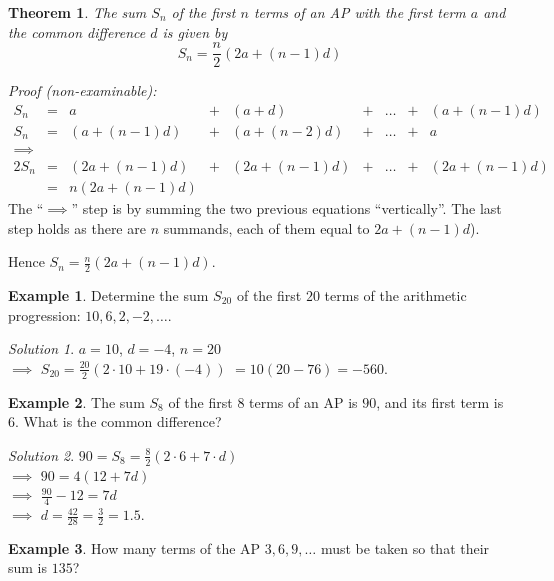 \documentclass[
  english,
  12pt,
  oneside]{book}
\newtheorem{theorem}{Theorem}[chapter]
\theoremstyle{definition}
\theoremstyle{definition}
\newtheorem{example}{Example}[chapter]
\theoremstyle{definition}
\theoremstyle{definition}
\theoremstyle{remark}
\newtheorem*{solution}{Solution}
\begin{document}
\begin{theorem}
The sum \(S_n\) of the first \(n\) terms of an AP with the first term \(a\) and the common difference \(d\) is given by
\[\boxed{S_n=\frac{n}2\left(2a+(n-1)d\right)}\]
\end{theorem}

\emph{Proof (non-examinable):}
\[\begin{array}{ccccccccc}
S_n &=& a & + & (a+d) & + & \dots & + & (a+(n-1)d) \\
S_n &=& (a+(n-1)d) & + & (a+(n-2)d) & + &  \dots & + & a\\
\implies \\
2S_n & = & (2a+(n-1)d) & + & (2a+(n-1)d) & + & \dots & + & (2a+(n-1)d)\\
& = & n(2a+(n-1)d)
\end{array}\]
The ``\(\implies\)'' step is by summing the two previous equations ``vertically''. The last step holds as there are \(n\) summands, each of them equal to \(2a+(n-1)d\)).

Hence \(S_n = \frac{n}{2}(2a+(n-1)d)\).

\begin{example}
Determine the sum \(S_{20}\) of the first \(20\) terms of the arithmetic progression: \(10, 6, 2, -2, \dots\).
\end{example}

\begin{solution}
\(a=10\), \(d=-4\), \(n=20\)\\
\(\implies\) \(S_{20}=\frac{20}{2}(2\cdot 10+ 19\cdot(-4))\) \(=10(20-76)=-560\).
\end{solution}

\begin{example}
The sum \(S_8\) of the first \(8\) terms of an AP is \(90\), and its first term is \(6\). What is the common difference?
\end{example}

\begin{solution}
\(90=S_8=\frac{8}{2}(2\cdot 6 + 7\cdot d)\)\\
\(\implies\) \(90=4(12+7d)\)\\
\(\implies\) \(\frac{90}{4}-12=7d\)\\
\(\implies\) \(d=\frac{42}{28}=\frac32=1.5\).
\end{solution}

\begin{example}
How many terms of the AP \(3,6,9,\dots\) must be taken so that their sum is \(135\)?
\end{example}
\end{document}
